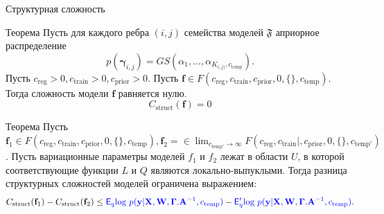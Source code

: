 \documentclass[usenames,dvipsnames,11pt,pdf,utf8,russian,aspectratio=169]{beamer}
\begin{document}
\begin{frame}{Структурная сложность}
\small

\begin{block}{Теорема}
Пусть для каждого ребра $(i,j)$ семейства моделей $\mathfrak{F}$ априорное распределение $$p(\boldsymbol{\gamma}_{i,j}) =  GS (\alpha_1, \dots, \alpha_{K_{i,j)}, c_{\text{temp}}}).$$
Пусть $c_{\text{reg}} >0, c_{\text{train}} >0, c_{\text{prior}}>0$.
Пусть $\mathbf{f} \in F(c_{\text{reg}}, c_{\text{train}}, c_{\text{prior}}, 0, \{\}, c_{\text{temp}})$.
Тогда сложность модели $\mathbf{f}$ равняется нулю.
\[
    C_\text{struct}(\mathbf{f}) = 0
\]
\end{block}

\begin{block}{Теорема}
Пусть $\mathbf{f}_1 \in F(c_{\text{reg}}, c_{\text{train}},  c_{\text{prior}}, 0, \{\},  c_{\text{temp}}), \mathbf{f}_2 =  \in \lim_{c_{\text{temp}'} \to \infty} F(c_{\text{reg}}, c_{\text{train}}|,  c_{\text{prior}}, 0, \{\},  c_{\text{temp}'})$.
Пусть вариационные параметры моделей $f_1$ и $f_2$ лежат в области $U$, в которой соответствующие функции $L$ и $Q$ являются локально-выпуклыми. 
Тогда разница структурных сложностей моделей ограничена выражением:
\[
    C_\text{struct}(\mathbf{f}_1)  - C_\text{struct}(\mathbf{f}_2) \leq \textcolor{blue}{\mathsf{E}_q \text{log}~{p(\mathbf{y} | \mathbf{X}, \mathbf{W}, \boldsymbol{\Gamma}. \mathbf{A}^{-1}, c_{\text{temp}})}} - \textcolor{blue}{\mathsf{E}_q' \text{log}~{p(\mathbf{y} | \mathbf{X}, \mathbf{W}, \boldsymbol{\Gamma}. \mathbf{A}^{-1}, c_{\text{temp}})}}.
\]
\end{block}

\end{frame}
\end{document}
